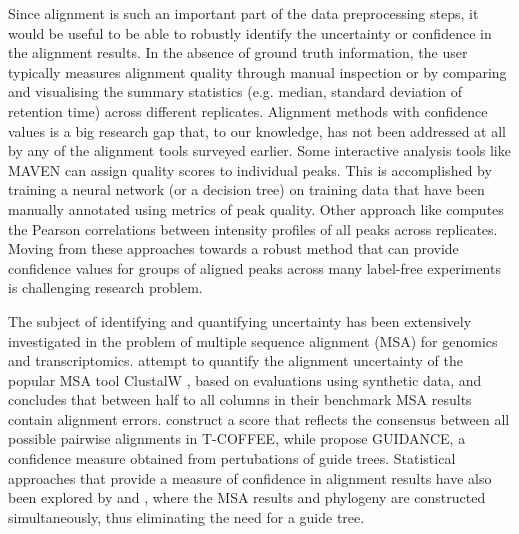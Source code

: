 Since alignment is such an important part of the data preprocessing steps, it would be useful to be able to robustly identify the uncertainty or confidence in the alignment results. In the absence of ground truth information, the user typically measures alignment quality through manual inspection or by comparing and visualising the summary statistics (e.g. median, standard deviation of retention time) across different replicates. Alignment methods with confidence values is a big research gap that, to our knowledge, has not been addressed at all by any of the alignment tools surveyed earlier. Some interactive analysis tools like MAVEN \cite{Melamud2010} can assign quality scores to individual peaks. This is accomplished by training a neural network (or a decision tree) on training data that have been manually annotated using metrics of peak quality. Other approach like \cite{Brodsky2010} computes the Pearson correlations between intensity profiles of all peaks across replicates. Moving from these approaches towards a robust method that can provide confidence values for groups of aligned peaks across many label-free experiments is challenging research problem.

The subject of identifying and quantifying uncertainty has been extensively investigated in the problem of multiple sequence alignment (MSA) for genomics and transcriptomics. \cite{Landan2009} attempt to quantify the alignment uncertainty of the popular MSA tool ClustalW \cite{Thompson1994}, based on evaluations using synthetic data, and concludes that between half to all columns in their benchmark MSA results contain alignment errors. \cite{Notredame2000} construct a score that reflects the consensus between all possible pairwise alignments in T-COFFEE, while \cite{Penn2010} propose GUIDANCE, a confidence measure obtained from pertubations of guide trees. Statistical approaches that provide a measure of confidence in alignment results have also been explored by \cite{Redelings2005} and \cite{Bradley2009}, where the MSA results and phylogeny are constructed simultaneously, thus eliminating the need for a guide tree. 

